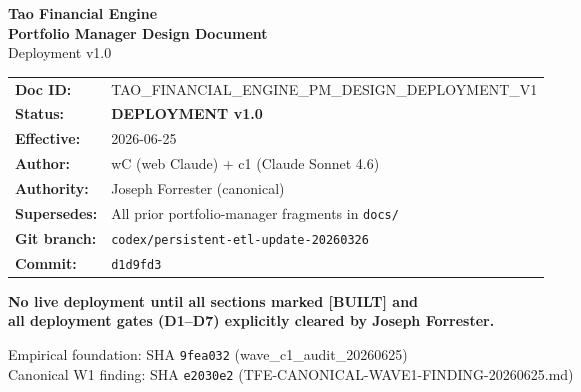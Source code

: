 \documentclass[11pt,a4paper]{article}
\newcommand{\statusbuilt}{\textcolor{statusbuilt}{\textbf{[BUILT]}}}
\newcommand{\code}[1]{\texttt{\small#1}}
\newcommand{\sha}[1]{\texttt{\footnotesize#1}}
\begin{document}

\begin{titlepage}
  \centering
  \vspace*{2cm}
  {\Huge\bfseries\color{tfeblue} Tao Financial Engine}\\[0.4cm]
  {\Large\bfseries Portfolio Manager Design Document}\\[0.2cm]
  {\large Deployment v1.0}\\[2cm]

  \begin{tabular}{ll}
    \textbf{Doc ID:}       & \small TAO\_FINANCIAL\_ENGINE\_PM\_DESIGN\_DEPLOYMENT\_V1 \\[4pt]
    \textbf{Status:}       & \textcolor{statusbuilt}{\bfseries DEPLOYMENT v1.0} \\[4pt]
    \textbf{Effective:}    & 2026-06-25 \\[4pt]
    \textbf{Author:}       & wC (web Claude) + c1 (Claude Sonnet 4.6) \\[4pt]
    \textbf{Authority:}    & Joseph Forrester (canonical) \\[4pt]
    \textbf{Supersedes:}   & All prior portfolio-manager fragments in \texttt{docs/}\\[4pt]
    \textbf{Git branch:}   & \code{codex/persistent-etl-update-20260326} \\[4pt]
    \textbf{Commit:}       & \sha{d1d9fd3}\\
  \end{tabular}

  \vspace{2cm}
  \begin{tcolorbox}[colback=tfeblue!5, colframe=tfeblue!50, boxrule=1pt, arc=4pt]
    \centering\small\bfseries
    No live deployment until all sections marked \statusbuilt{} and\\
    all deployment gates (D1–D7) explicitly cleared by Joseph Forrester.
  \end{tcolorbox}

  \vfill
  {\small\color{tfegray}
    Empirical foundation: SHA \sha{9fea032} (wave\_c1\_audit\_20260625)\\
    Canonical W1 finding: SHA \sha{e2030e2} (TFE-CANONICAL-WAVE1-FINDING-20260625.md)
  }
\end{titlepage}

\tableofcontents
\newpage

\setcounter{section}{-1}
\end{document}
